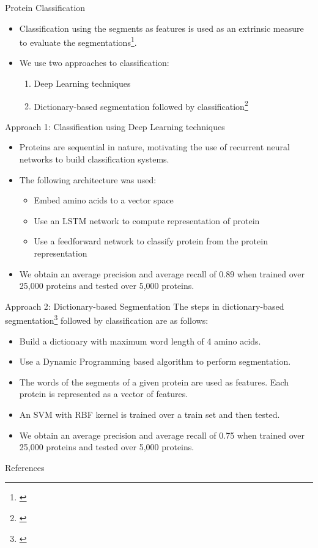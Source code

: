 \documentclass{beamer}
\begin{document}
\begin{frame}{Protein Classification}
	\begin{itemize}
		\item Classification using the segments as features is used as an extrinsic measure to evaluate the segmentations\footnote{\cite{devi2017protein}}.
		\item We use two approaches to classification:
		\begin{enumerate}
			\item Deep Learning techniques
			\item Dictionary-based segmentation followed by classification\footnote{\cite{yang2008classification}}
		\end{enumerate}
	\end{itemize}
\end{frame}
\begin{frame}{Approach 1: Classification using Deep Learning techniques}
	\begin{itemize}
		\item Proteins are sequential in nature, motivating the use of recurrent neural networks to build classification systems.
		\item The following architecture was used:
			\begin{itemize}
				\item Embed amino acids to a vector space
				\item Use an LSTM network to compute representation of protein
				\item Use a feedforward network to classify protein from the protein representation 
			\end{itemize}
		\item We obtain an average precision and average recall of 0.89 when trained over 25,000 proteins and tested over 5,000 proteins.
	\end{itemize}
\end{frame}

\begin{frame}{Approach 2: Dictionary-based Segmentation}
	The steps in dictionary-based segmentation\footnote{\cite{yang2008classification}} followed by classification are as follows:
	\begin{itemize}		
		\item Build a dictionary with maximum word length of 4 amino acids.
		\item Use a Dynamic Programming based algorithm to perform segmentation.
		\item The words of the segments of a given protein are used as features. Each protein is represented as a vector of features.
		\item An SVM with RBF kernel is trained over a train set and then tested.
		\item We obtain an average precision and average recall of 0.75 when trained over 25,000 proteins and tested over 5,000 proteins.
	\end{itemize}
\end{frame}

\begin{frame}{References}
	
	
\end{frame}
\end{document}
